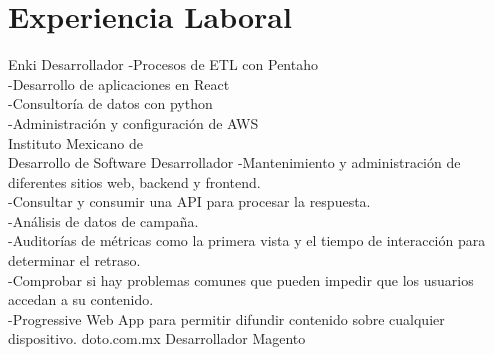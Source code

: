 \documentclass[%
	       doublesided,
	       paper=a4,
	       fontsize=10pt
	      ]{my-resume}
\begin{document}
{    \section[\faGears]{Experiencia Laboral}
	{Enki}
	{Desarrollador}
	{
	    -Procesos de ETL con Pentaho\\
	    -Desarrollo de aplicaciones en React\\ 
	    -Consultoría de datos con python\\
	    -Administración y configuración de AWS\\ 
	    }
	{Instituto Mexicano de \\Desarrollo de Software}
	{Desarrollador}
	{
	    -Mantenimiento y administración de diferentes sitios web, backend y frontend.\\ 
	    -Consultar y consumir una API para procesar la respuesta.\\ 
	    -Análisis de datos de campaña.\\
	    -Auditorías de métricas como la primera vista y el tiempo de interacción para determinar el retraso.\\ 
	    -Comprobar si hay problemas comunes que pueden impedir que los usuarios accedan a su contenido.\\
	    -Progressive Web App para permitir difundir contenido sobre cualquier dispositivo.
	    }
	{doto.com.mx}
	{Desarrollador Magento}
	{
}}
\end{document}
